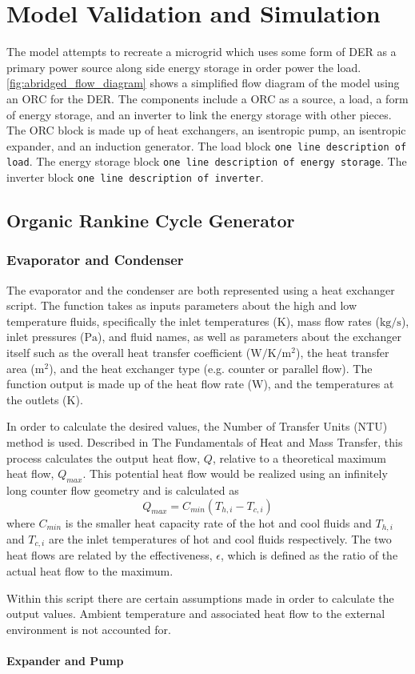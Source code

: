 \chapter{Model Validation and Simulation}
\label{ch:model}

The model attempts to recreate a microgrid which uses some form of DER as a primary power source along side energy storage in order power the load. \autoref{fig:abridged_flow_diagram} shows a simplified flow diagram of the model using an ORC for the DER. The components include a ORC as a source, a load, a form of energy storage, and an inverter to link the energy storage with other pieces. The ORC block is made up of heat exchangers, an isentropic pump, an isentropic expander, and an induction generator. The load block \verb|one line description of load|. The energy storage block \verb|one line description of energy storage|. The inverter block \verb|one line description of inverter|.



\section{Organic Rankine Cycle Generator}

\subsection{Evaporator and Condenser}
The evaporator and the condenser are both represented using a heat exchanger script.  The function takes as inputs parameters about the high and low temperature fluids, specifically the inlet temperatures ($\si{\kelvin}$), mass flow rates ($\si{\kilogram\per\second} $), inlet pressures ($\si{\pascal}$), and fluid names, as well as parameters about the exchanger itself such as the overall heat transfer coefficient ($\si{\watt\per\kelvin\per\meter\squared}$), the heat transfer area ($\si{\meter\squared}$), and the heat exchanger type (e.g. counter or parallel flow). The function output is made up of the heat flow rate ($\si{\watt}$), and the temperatures at the outlets ($\si{\kelvin}$).

In order to calculate the desired values, the Number of Transfer Units (NTU) method is used. Described in The Fundamentals of Heat and Mass Transfer, \cite{Incropera} this process calculates the output heat flow, $Q$, relative to a theoretical maximum heat flow, $Q_{max}$. This potential heat flow would be realized using an infinitely long counter flow geometry and is calculated as 
\begin{equation}
Q_{max} = C_{min}\left(T_{h,i} - T_{c,i}\right)
\end{equation}
where $C_{min}$ is the smaller heat capacity rate of the hot and cool fluids and $T_{h,i}$ and $T_{c,i}$ are the inlet temperatures of hot and cool fluids respectively. The two heat flows are related by the effectiveness, $\epsilon$, which is defined as the ratio of the actual heat flow to the maximum.


Within this script there are certain assumptions made in order to calculate the output values. Ambient temperature and associated heat flow to the external environment is not accounted for.

\subsubsection{Expander and Pump}